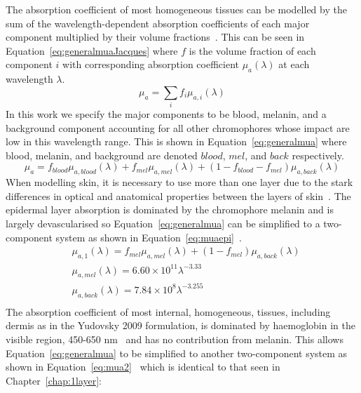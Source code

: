 The absorption coefficient of most homogeneous tissues can be modelled by the sum of the wavelength-dependent absorption coefficients of each major component multiplied by their volume fractions~\citep{Jacques2013}. 
This can be seen in Equation~\eqref{eq:generalmuaJacques} where $f$ is the volume fraction of each component $i$ with corresponding absorption coefficient $\mu_a(\lambda)$ at each wavelength $\lambda$. 
\begin{equation}
    \mu_a = \sum_i{f_i\mu_{a, i}(\lambda)}
    \label{eq:generalmuaJacques}
\end{equation}
In this work we specify the major components to be blood, melanin, and a background component accounting for all other chromophores whose impact are low in this wavelength range. This is shown in Equation~\eqref{eq:generalmua} where blood, melanin, and background are denoted $blood$, $mel$, and $back$ respectively.
\begin{equation}
    \mu_a = f_{blood}\mu_{a, blood}(\lambda) + f_{mel}\mu_{a, mel}(\lambda) + (1 - f_{blood} - f_{mel})\mu_{a, back}(\lambda)
    \label{eq:generalmua}
\end{equation}
When modelling skin, it is necessary to use more than one layer due to the stark differences in optical and anatomical properties between the layers of skin~\citep{Mignon2018}. The epidermal layer absorption is dominated by the chromophore melanin and is largely devascularised so Equation~\eqref{eq:generalmua} can be simplified to a two-component system as shown in Equation~\eqref{eq:muaepi}~\citep{Yudovsky2009}.
\begin{equation}
\begin{aligned}
    & \mu_{a, 1}(\lambda) = f_{mel}\mu_{a, mel}(\lambda) + (1-f_{mel})\mu_{a, back}(\lambda) \\
    & \mu_{a, mel}(\lambda) = 6.60\times10^{11}\lambda^{-3.33}\\
    & \mu_{a, back}(\lambda) = 7.84\times10^8\lambda^{-3.255}\\
\end{aligned}
\label{eq:muaepi}
\end{equation}
The absorption coefficient of most internal, homogeneous, tissues, including dermis as in the Yudovsky 2009 formulation, is dominated by haemoglobin in the visible region, 450-650 nm~\citep{JacquesAbs} and has no contribution from melanin. This allows Equation~\eqref{eq:generalmua} to be simplified to another two-component system as shown in Equation~\eqref{eq:mua2}~\citep{Yudovsky2009} which is identical to that seen in Chapter~\ref{chap:1layer}: 
